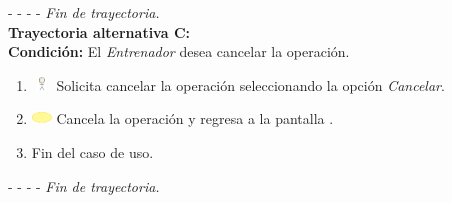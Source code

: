 - - - - \textit{Fin de trayectoria.} \\

\textbf{\large{Trayectoria alternativa C:}}\\
\textbf{Condición: } El \textit{Entrenador} desea cancelar la operación.

\begin{enumerate}
	\item \includegraphics[width=15pt, height=10pt]{./Figuras/iconosCU/usuario.png} Solicita cancelar la operación seleccionando la opción \textit{Cancelar}.
	\item \includegraphics[width=15pt]{./Figuras/iconosCU/herramienta.png} Cancela la operación y regresa a la pantalla .
	\item Fin del caso de uso.
\end{enumerate}

- - - - \textit{Fin de trayectoria.} \\

\clearpage